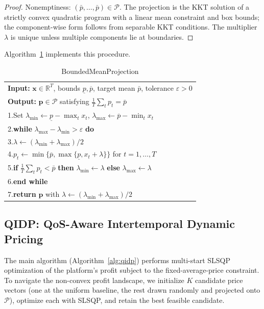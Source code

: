 \documentclass[11pt]{article}
\newcommand{\pcap}{\bar p}
\begin{document}
\begin{proof}
  Nonemptiness: $(\pcap,\dots,\pcap)\in\mathcal{P}$.
  The projection is the KKT solution of a strictly convex quadratic program
  with a linear mean constraint and box bounds; the component-wise form
  follows from separable KKT conditions. The multiplier $\lambda$ is unique
  unless multiple components lie at boundaries.
\end{proof}

Algorithm~\ref{alg:projection} implements this procedure.

\begin{table}[htbp]
\centering
\caption{BoundedMeanProjection}
\label{alg:projection}
\begin{tabular}{p{}}
\toprule
\textbf{Input:} $\boldsymbol{x}\in\mathbb{R}^T$, bounds $\underline p,\overline p$, target mean $\pcap$, tolerance $\varepsilon>0$ \\
\textbf{Output:} $\boldsymbol{p}\in\mathcal{P}$ satisfying $\frac1T\sum_t p_t=\pcap$ \\
\midrule
1.\quad Set $\lambda_{\min}\leftarrow\underline p-\max_t x_t$, $\lambda_{\max}\leftarrow\overline p-\min_t x_t$ \\
2.\quad \textbf{while} $\lambda_{\max}-\lambda_{\min}>\varepsilon$ \textbf{do} \\
3.\quad\quad $\lambda\leftarrow(\lambda_{\min}+\lambda_{\max})/2$ \\
4.\quad\quad $p_t\leftarrow\min\{\overline p,\max\{\underline p,x_t+\lambda\}\}$ for $t=1,\dots,T$ \\
5.\quad\quad \textbf{if} $\frac1T\sum_t p_t < \pcap$ \textbf{then} $\lambda_{\min}\leftarrow\lambda$ \textbf{else} $\lambda_{\max}\leftarrow\lambda$ \\
6.\quad \textbf{end while} \\
7.\quad \textbf{return} $\boldsymbol{p}$ with $\lambda\leftarrow(\lambda_{\min}+\lambda_{\max})/2$ \\
\bottomrule
\end{tabular}
\end{table}

\subsection{QIDP: QoS-Aware Intertemporal Dynamic Pricing}

The main algorithm (Algorithm~\ref{alg:qidp}) performs multi-start SLSQP
optimization of the platform's profit subject to the fixed-average-price
constraint. To navigate the non-convex profit landscape, we initialize
$K$ candidate price vectors (one at the uniform baseline, the rest drawn
randomly and projected onto $\mathcal{P}$), optimize each with SLSQP, and
retain the best feasible candidate.
\end{document}
